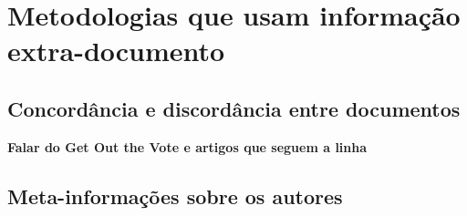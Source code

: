 \chapter{Metodologias que usam informação extra-documento}

\section{Concordância e discordância entre documentos}
  \textbf{Falar do Get Out the Vote e artigos que seguem a linha}

\section{Meta-informações sobre os autores}

